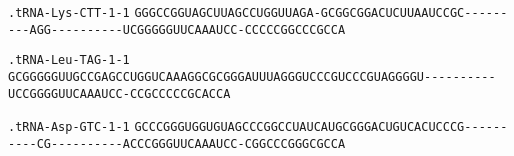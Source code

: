 \documentclass{article}
\newcommand{\rnabox}[1]{\colorbox{#1}{\texttt{#1}}}
\begin{document}
\texttt{.tRNA-Lys-CTT-1-1}
\rnabox{G}\rnabox{G}\rnabox{G}\rnabox{C}\rnabox{C}\rnabox{G}\rnabox{G}\rnabox{U}\rnabox{A}\rnabox{G}\rnabox{C}\rnabox{U}\rnabox{U}\rnabox{A}\rnabox{G}\rnabox{C}\rnabox{C}\rnabox{U}\rnabox{G}\rnabox{G}\rnabox{U}\rnabox{U}\rnabox{A}\rnabox{G}\rnabox{A}\rnabox{-}\rnabox{G}\rnabox{C}\rnabox{G}\rnabox{G}\rnabox{C}\rnabox{G}\rnabox{G}\rnabox{A}\rnabox{C}\rnabox{U}\rnabox{C}\rnabox{U}\rnabox{U}\rnabox{A}\rnabox{A}\rnabox{U}\rnabox{C}\rnabox{C}\rnabox{G}\rnabox{C}\rnabox{-}\rnabox{-}\rnabox{-}\rnabox{-}\rnabox{-}\rnabox{-}\rnabox{-}\rnabox{-}\rnabox{-}\rnabox{A}\rnabox{G}\rnabox{G}\rnabox{-}\rnabox{-}\rnabox{-}\rnabox{-}\rnabox{-}\rnabox{-}\rnabox{-}\rnabox{-}\rnabox{-}\rnabox{-}\rnabox{U}\rnabox{C}\rnabox{G}\rnabox{G}\rnabox{G}\rnabox{G}\rnabox{G}\rnabox{U}\rnabox{U}\rnabox{C}\rnabox{A}\rnabox{A}\rnabox{A}\rnabox{U}\rnabox{C}\rnabox{C}\rnabox{-}\rnabox{C}\rnabox{C}\rnabox{C}\rnabox{C}\rnabox{C}\rnabox{G}\rnabox{G}\rnabox{C}\rnabox{C}\rnabox{C}\rnabox{G}\rnabox{C}\rnabox{C}\rnabox{A}

\vspace{-0.5mm}

\texttt{.tRNA-Leu-TAG-1-1}
\rnabox{G}\rnabox{C}\rnabox{G}\rnabox{G}\rnabox{G}\rnabox{G}\rnabox{G}\rnabox{U}\rnabox{U}\rnabox{G}\rnabox{C}\rnabox{C}\rnabox{G}\rnabox{A}\rnabox{G}\rnabox{C}\rnabox{C}\rnabox{U}\rnabox{G}\rnabox{G}\rnabox{U}\rnabox{C}\rnabox{A}\rnabox{A}\rnabox{A}\rnabox{G}\rnabox{G}\rnabox{C}\rnabox{G}\rnabox{C}\rnabox{G}\rnabox{G}\rnabox{G}\rnabox{A}\rnabox{U}\rnabox{U}\rnabox{U}\rnabox{A}\rnabox{G}\rnabox{G}\rnabox{G}\rnabox{U}\rnabox{C}\rnabox{C}\rnabox{C}\rnabox{G}\rnabox{U}\rnabox{C}\rnabox{C}\rnabox{C}\rnabox{G}\rnabox{U}\rnabox{A}\rnabox{G}\rnabox{G}\rnabox{G}\rnabox{G}\rnabox{U}\rnabox{-}\rnabox{-}\rnabox{-}\rnabox{-}\rnabox{-}\rnabox{-}\rnabox{-}\rnabox{-}\rnabox{-}\rnabox{-}\rnabox{U}\rnabox{C}\rnabox{C}\rnabox{G}\rnabox{G}\rnabox{G}\rnabox{G}\rnabox{U}\rnabox{U}\rnabox{C}\rnabox{A}\rnabox{A}\rnabox{A}\rnabox{U}\rnabox{C}\rnabox{C}\rnabox{-}\rnabox{C}\rnabox{C}\rnabox{G}\rnabox{C}\rnabox{C}\rnabox{C}\rnabox{C}\rnabox{C}\rnabox{G}\rnabox{C}\rnabox{A}\rnabox{C}\rnabox{C}\rnabox{A}

\vspace{-0.5mm}

\texttt{.tRNA-Asp-GTC-1-1}
\rnabox{G}\rnabox{C}\rnabox{C}\rnabox{C}\rnabox{G}\rnabox{G}\rnabox{G}\rnabox{U}\rnabox{G}\rnabox{G}\rnabox{U}\rnabox{G}\rnabox{U}\rnabox{A}\rnabox{G}\rnabox{C}\rnabox{C}\rnabox{C}\rnabox{G}\rnabox{G}\rnabox{C}\rnabox{C}\rnabox{U}\rnabox{A}\rnabox{U}\rnabox{C}\rnabox{A}\rnabox{U}\rnabox{G}\rnabox{C}\rnabox{G}\rnabox{G}\rnabox{G}\rnabox{A}\rnabox{C}\rnabox{U}\rnabox{G}\rnabox{U}\rnabox{C}\rnabox{A}\rnabox{C}\rnabox{U}\rnabox{C}\rnabox{C}\rnabox{C}\rnabox{G}\rnabox{-}\rnabox{-}\rnabox{-}\rnabox{-}\rnabox{-}\rnabox{-}\rnabox{-}\rnabox{-}\rnabox{-}\rnabox{-}\rnabox{C}\rnabox{G}\rnabox{-}\rnabox{-}\rnabox{-}\rnabox{-}\rnabox{-}\rnabox{-}\rnabox{-}\rnabox{-}\rnabox{-}\rnabox{-}\rnabox{A}\rnabox{C}\rnabox{C}\rnabox{C}\rnabox{G}\rnabox{G}\rnabox{G}\rnabox{U}\rnabox{U}\rnabox{C}\rnabox{A}\rnabox{A}\rnabox{A}\rnabox{U}\rnabox{C}\rnabox{C}\rnabox{-}\rnabox{C}\rnabox{G}\rnabox{G}\rnabox{C}\rnabox{C}\rnabox{C}\rnabox{G}\rnabox{G}\rnabox{G}\rnabox{C}\rnabox{G}\rnabox{C}\rnabox{C}\rnabox{A}
\end{document}
